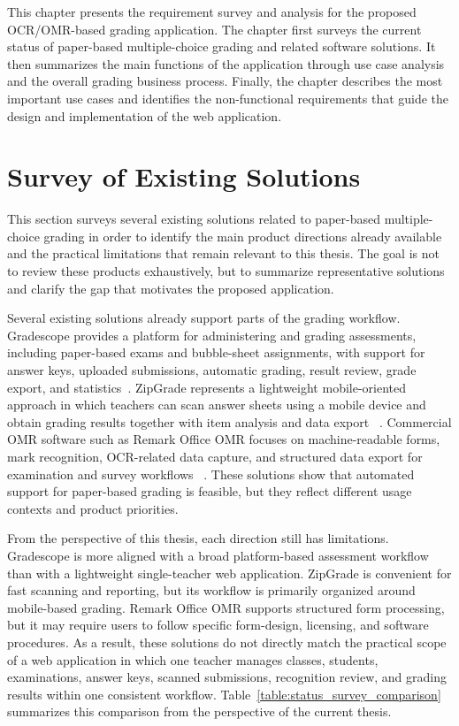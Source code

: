 \documentclass[../Main.tex]{subfiles}
\begin{document}
This chapter presents the requirement survey and analysis for the proposed
OCR/OMR-based grading application. The chapter first surveys the current status of
paper-based multiple-choice grading and related software solutions. It then
summarizes the main functions of the application through use case analysis and the
overall grading business process. Finally, the chapter describes the most
important use cases and identifies the non-functional requirements that guide the
design and implementation of the web application.

\section{Survey of Existing Solutions}
\label{section:2.1}

This section surveys several existing solutions related to paper-based
multiple-choice grading in order to identify the main product directions already
available and the practical limitations that remain relevant to this thesis. The
goal is not to review these products exhaustively, but to summarize
representative solutions and clarify the gap that motivates the proposed
application.

Several existing solutions already support parts of the grading workflow.
Gradescope
provides a platform for administering and grading assessments, including
paper-based exams and bubble-sheet assignments, with support for answer keys,
uploaded submissions, automatic grading, result review, grade export, and
statistics~\cite{gradescope2026}. ZipGrade represents a lightweight
mobile-oriented approach in which teachers can scan answer sheets using a mobile
device and obtain grading results together with item analysis and data export
~\cite{zipgrade2026}. Commercial OMR software such as Remark Office OMR focuses
on machine-readable forms, mark recognition, OCR-related data capture, and
structured data export for examination and survey workflows
~\cite{remarkoffice2026}. These solutions show that automated support for
paper-based grading is feasible, but they reflect different usage contexts and
product priorities.

From the perspective of this thesis, each direction still has limitations.
Gradescope is more aligned with a broad platform-based assessment workflow than
with a lightweight single-teacher web application. ZipGrade is convenient for
fast scanning and reporting, but its workflow is primarily organized around
mobile-based grading. Remark Office OMR supports structured form processing, but
it may require users to follow specific form-design, licensing, and software
procedures. As a result, these solutions do not directly match the practical
scope of a web application in which one teacher manages classes, students,
examinations, answer keys, scanned submissions, recognition review, and grading
results within one consistent workflow. Table~\ref{table:status_survey_comparison}
summarizes this comparison from the perspective of the current thesis.
\end{document}
